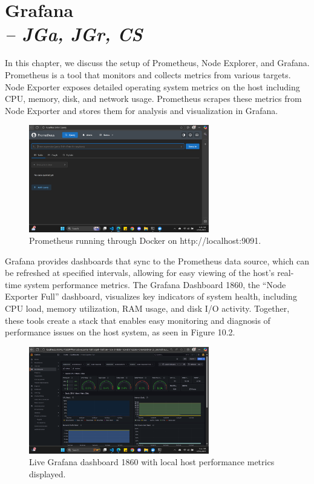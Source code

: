 \chapter[Grafana]{Grafana \\
\small{\textit{-- JGa, JGr, CS}}
\label{Chapter::Grafana}}

In this chapter, we discuss the setup of Prometheus, Node Explorer, and Grafana. Prometheus is a tool that monitors and collects metrics from various targets.
Node Exporter exposes detailed operating system metrics on the host including CPU, memory, disk, and network usage.
Prometheus scrapes these metrics from Node Exporter and stores them for analysis and visualization in Grafana. 

\begin{figure}[h]
  \centering
  \includegraphics[width=0.7\textwidth]{png/prometheus_ss.png}
  \caption{Prometheus running through Docker on http://localhost:9091.}
  \label{fig:prometheus_ss}
\end{figure}

Grafana provides dashboards that sync to the Prometheus data source, which can be refreshed at specified intervals, 
allowing for easy viewing of the host's real-time system performance metrics.
The Grafana Dashboard 1860, the “Node Exporter Full” dashboard, visualizes key indicators of system health, 
including CPU load, memory utilization, RAM usage, and disk I/O activity.
Together, these tools create a stack that enables easy monitoring and diagnosis of performance issues on the host system, as seen in Figure 10.2.

\begin{figure}[h]
  \centering
  \includegraphics[width=0.7\textwidth]{png/grafana_dash1860_ss.png}
  \caption{Live Grafana dashboard 1860 with local host performance metrics displayed.}
  \label{fig:grafana_dash1860_ss}
\end{figure}
